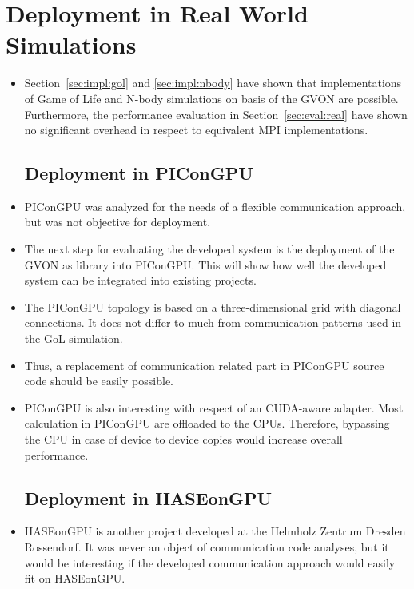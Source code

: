 \section*{Deployment in Real World Simulations}
\begin{itemize}

\item Section~\ref{sec:impl:gol} and \ref{sec:impl:nbody} have shown
  that implementations of Game of Life and N-body simulations on basis
  of the GVON are possible. Furthermore, the performance evaluation in
  Section~\ref{sec:eval:real} have shown no significant overhead in
  respect to equivalent MPI implementations.

  \subsection*{Deployment in PIConGPU}
\item PIConGPU was analyzed for the needs of a flexible communication
  approach, but was not objective for deployment.

\item The next step for evaluating the developed system is the
  deployment of the GVON as library into PIConGPU. This will show how
  well the developed system can be integrated into existing projects.


\item The PIConGPU topology is based on a three-dimensional grid with
  diagonal connections. It does not differ to much from communication
  patterns used in the GoL simulation.

\item Thus, a replacement of communication related part in PIConGPU
  source code should be easily possible.

\item PIConGPU is also interesting with respect of an CUDA-aware
  adapter.  Most calculation in PIConGPU are offloaded to the
  CPUs. Therefore, bypassing the CPU in case of device to device
  copies would increase overall performance.

  \subsection*{Deployment in HASEonGPU}
\item HASEonGPU is another project developed at the Helmholz Zentrum
  Dresden Rossendorf.  It was never an object of communication code
  analyses, but it would be interesting if the developed communication
  approach would easily fit on HASEonGPU.


\end{itemize}
